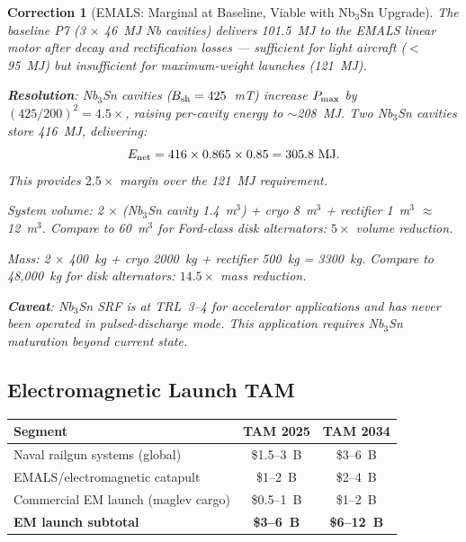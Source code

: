\documentclass[11pt]{article}
\newtheorem{correction}{Correction}
\newcommand{\Pmax}{P_{\rm max}}
\begin{document}
\begin{correction}[EMALS: Marginal at Baseline, Viable with Nb$_3$Sn Upgrade]
\label{corr:EMALS}
The baseline P7 (3 $\times$ 46~MJ Nb cavities) delivers 101.5~MJ
to the EMALS linear motor after decay and rectification losses ---
sufficient for light aircraft ($<$95~MJ) but insufficient for
maximum-weight launches (121~MJ).

\textbf{Resolution}: Nb$_3$Sn cavities ($B_{\rm sh} = 425$~mT)
increase $\Pmax$ by $(425/200)^2 = 4.5\times$, raising per-cavity
energy to $\sim$208~MJ. Two Nb$_3$Sn cavities store 416~MJ, delivering:
\begin{equation}
E_{\rm net} = 416 \times 0.865 \times 0.85 = 305.8~\text{MJ}.
\end{equation}
This provides $2.5\times$ margin over the 121~MJ requirement.

System volume: 2 $\times$ (Nb$_3$Sn cavity 1.4~m$^3$) + cryo 8~m$^3$
+ rectifier 1~m$^3$ $\approx$ 12~m$^3$. Compare to 60~m$^3$ for
Ford-class disk alternators: $5\times$ volume reduction.

Mass: 2 $\times$ 400~kg + cryo 2000~kg + rectifier 500~kg
= 3300~kg. Compare to 48,000~kg for disk alternators:
$14.5\times$ mass reduction.

\textbf{Caveat}: Nb$_3$Sn SRF is at TRL~3--4 for accelerator
applications and has never been operated in pulsed-discharge mode.
This application requires Nb$_3$Sn maturation beyond current state.
\end{correction}

\subsection{Electromagnetic Launch TAM}

\begin{center}
\begin{tabular}{lcc}
\toprule
Segment & TAM 2025 & TAM 2034 \\
\midrule
Naval railgun systems (global) & \$1.5--3~B & \$3--6~B \\
EMALS/electromagnetic catapult & \$1--2~B & \$2--4~B \\
Commercial EM launch (maglev cargo) & \$0.5--1~B & \$1--2~B \\
\midrule
\textbf{EM launch subtotal} & \textbf{\$3--6~B} & \textbf{\$6--12~B} \\
\bottomrule
\end{tabular}
\end{center}
\end{document}
